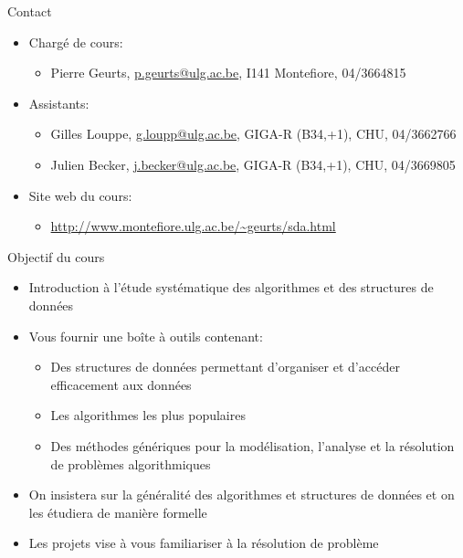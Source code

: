 
\begin{frame}{Contact}
\begin{itemize}
\item Chargé de cours: 
\begin{itemize}
\item Pierre Geurts, \url{p.geurts@ulg.ac.be}, I141 Montefiore, 04/3664815
\end{itemize}
\item Assistants:
\begin{itemize}
\item Gilles Louppe, \url{g.loupp@ulg.ac.be}, GIGA-R (B34,+1), CHU, 04/3662766
\item Julien Becker, \url{j.becker@ulg.ac.be}, GIGA-R (B34,+1), CHU, 04/3669805
\end{itemize}
\item Site web du cours:
\begin{itemize}
\item \url{http://www.montefiore.ulg.ac.be/~geurts/sda.html}
\end{itemize}
\end{itemize}
\end{frame}

\begin{frame}{Objectif du cours}

\begin{itemize}
\item Introduction à l'étude systématique des algorithmes et des
  structures de données
\item Vous fournir une boîte à outils contenant:
\begin{itemize}
\item Des structures de données permettant d'organiser et d'accéder efficacement
  aux données
\item Les algorithmes les plus populaires
\item Des méthodes génériques pour la modélisation, l'analyse et la résolution de problèmes algorithmiques
\end{itemize}
\item On insistera sur la généralité des algorithmes et structures de données et on les étudiera de manière formelle
\item Les projets vise à vous familiariser à la résolution de problème
\end{itemize}

\end{frame}

